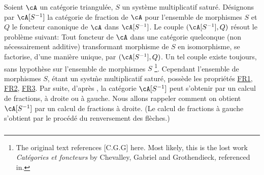 Soient $\cA$ un cat\'egorie triangul\'ee, $S$ un syst\`eme multiplicatif 
satur\'e. D\'esignons par $\cA[S^{-1}]$ la cat\'egorie de fraction de $\cA$ 
pour l'ensemble de morphismes $S$ et $Q$ le foncteur canonique de $\cA$ dans 
$\cA[S^{-1}]$. Le couple $(\cA[S^{-1}],Q)$ r\'esout le probl\`eme suivant: Tout 
foncteur de $\cA$ dans une cat\'egorie quelconque (non n\'ecessairement 
additive) transformant morphisme de $S$ en isomorphisme, se factorise, d'une 
mani\`ere unique, par $(\cA[S^{-1}],Q)$. Un tel couple existe toujours, sans 
hypoth\`ese sur l'ensemble de morphismes $S$ \cite[1.1]{gz67}\footnote{The 
original text references [C.G.G] here. Most likely, this is the lost work 
\emph{Cat\'egories et foncteurs} by Chevalley, Gabriel and Grothendieck, 
referenced in\cite{sc72}. }. Cependant l'ensemble 
de morphismes $S$, \'etant un syst\`me multiplicatif satur\'e, poss\`ede les 
propri\'et\'es \hyperlink{VIII:FR1}{FR1}, \hyperlink{VIII:FR2}{FR2}, 
\hyperlink{VIII:FR3}{FR3}. Par suite, d'apr\`es \cite{gz67}, la cat\'egorie 
$\cA[S^{-1}]$ peut s'obtenir par un calcul de fractions, \`a droite ou \`a 
gauche. Nous allons rappeler comment on obtient $\cA[S^{-1}]$ par un calcul de 
fractions \`a droite. (Le calcul de fractions \`a gauche s'obtient par le 
proc\'ed\'e du renversement des fl\`eches.) 





\subsubsection{}\label{VIII:2-3-2}

